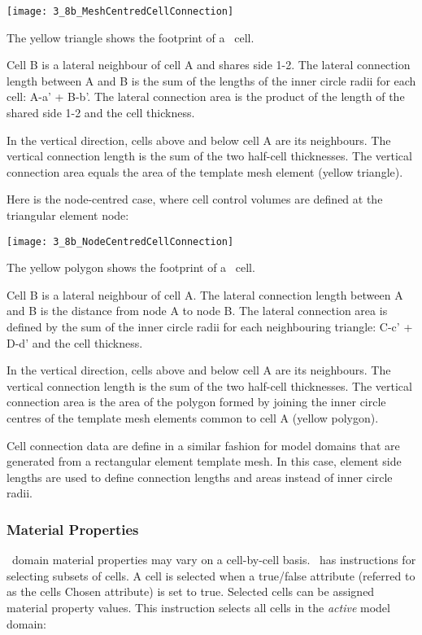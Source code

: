 {        \texttt{[image: 3\_8b\_MeshCentredCellConnection]}

The yellow triangle shows the footprint of a \mfus\ cell.

Cell B is a lateral neighbour of cell A and shares side 1-2.  The lateral connection length between A and B is the sum of the lengths of the inner circle radii for each cell: A-a' + B-b'.  The lateral connection area is the product of the length of the shared side 1-2 and the cell thickness.

In the vertical direction, cells above and below cell A are its neighbours.  The vertical connection length is the sum of the two half-cell thicknesses. The vertical connection area equals the area of the template mesh element (yellow triangle).

Here is the node-centred case, where cell control volumes are defined at the triangular element node:

        \texttt{[image: 3\_8b\_NodeCentredCellConnection]}

The yellow polygon shows the footprint of a \mfus\ cell.

Cell B is a lateral neighbour of cell A.  The lateral connection length between A and B is the distance from node A to node B. The lateral connection area is defined by the sum of the inner circle radii for each neighbouring triangle: C-c' + D-d' and the cell thickness.

In the vertical direction, cells above and below cell A are its neighbours.  The vertical connection length is the sum of the two half-cell thicknesses. The vertical connection area is the area of the polygon formed by joining the inner circle centres of the template mesh elements common to cell A (yellow polygon).

Cell connection data are define in a similar fashion for model domains that are generated from a rectangular element template mesh.  In this case, element side lengths are used to define connection lengths and areas instead of inner circle radii.


\subsubsection{Material Properties}   \label{section:matprops}

\gwf\ domain material properties may vary on a cell-by-cell  basis.  \mut\ has instructions for selecting subsets of cells. A cell is selected when a true/false attribute (referred to as  the cells \textsf{Chosen} attribute) is set to true. Selected cells can be assigned material property values.  This instruction selects all cells in the {\em active} model domain:

}
